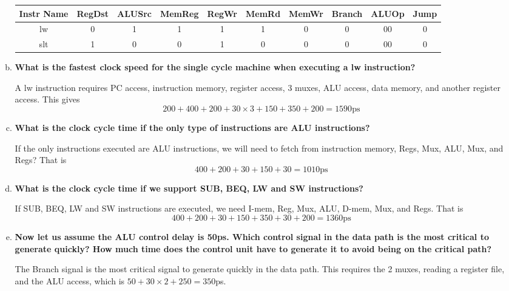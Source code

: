 \documentclass[10pt]{article} %
\begin{document}
\begin{enumerate}
\begin{enumerate}[(a)]
\begin{center}
\begin{tabular}{|c|c|c|c|c|c|c|c|c|c|}
\hline
Instr Name & RegDst & ALUSrc & MemReg & RegWr & MemRd & MemWr & Branch & ALUOp & Jump \\
\hline
lw & 0 & 1 & 1 & 1 & 1 & 0 & 0 & 00 & 0 \\
slt & 1 & 0 & 0 & 1 & 0 & 0 & 0 & 00 & 0 \\
\hline
\end{tabular}
\end{center}

\item 
\textbf{What is the fastest clock speed for the single cycle machine when executing a lw instruction? }

A lw instruction requires PC access, instruction memory, register access, 3 muxes, ALU access, data memory, and another register access.  This gives
$$ 200 + 400 + 200 + 30 \times 3 + 150 + 350 + 200 = 1590\text{ps} $$

\item 
\textbf{What is the clock cycle time if the only type of instructions are ALU instructions? }

If the only instructions executed are ALU instructions, we will need to fetch from instruction memory, Regs, Mux, ALU, Mux, and Regs?  That is
$$ 400 + 200 + 30 + 150 + 30 = 1010\text{ps} $$

\item 
\textbf{What is the clock cycle time if we support SUB, BEQ, LW and SW instructions? }

If SUB, BEQ, LW and SW instructions are executed, we need I-mem, Reg, Mux, ALU, D-mem, Mux, and Regs.  That is
$$ 400 + 200 + 30 + 150 + 350 + 30 + 200 = 1360\text{ps} $$

\item 
\textbf{Now let us assume the ALU control delay is 50ps.  Which control signal in the data path is the most critical to generate quickly?  How much time does the control unit have to generate it to avoid being on the critical path? }

The Branch signal is the most critical signal to generate quickly in the data path.  This requires the 2 muxes, reading a register file, and the ALU access, which is $50 + 30 \times 2 + 250 = 350$ps.  

\end{enumerate}


\end{enumerate}
\end{document}
